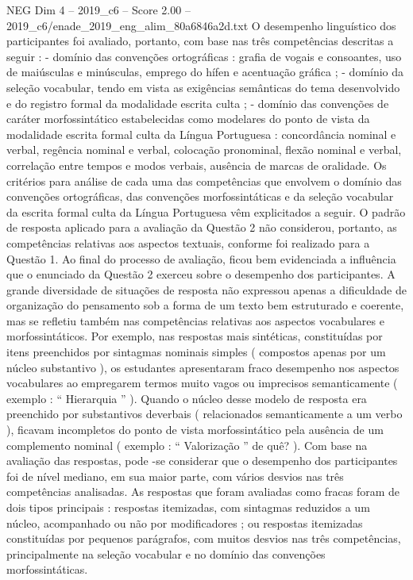 \begin{textsample}{NEG Dim 4 – 2019\_c6 – Score 2.00 – 2019\_c6/enade\_2019\_eng\_alim\_80a6846a2d.txt}
O desempenho linguístico dos participantes foi avaliado, portanto, com base nas três competências descritas a seguir : - domínio das convenções ortográficas : grafia de vogais e consoantes, uso de maiúsculas e minúsculas, emprego do hífen e acentuação gráfica ; - domínio da seleção vocabular, tendo em vista as exigências semânticas do tema desenvolvido e do registro formal da modalidade escrita culta ; - domínio das convenções de caráter morfossintático estabelecidas como modelares do ponto de vista da modalidade escrita formal culta da Língua Portuguesa : concordância nominal e verbal, regência nominal e verbal, colocação pronominal, flexão nominal e verbal, correlação entre tempos e modos verbais, ausência de marcas de oralidade.
Os critérios para análise de cada uma das competências que envolvem o domínio das convenções ortográficas, das convenções morfossintáticas e da seleção vocabular da escrita formal culta da Língua Portuguesa vêm explicitados a seguir.
O padrão de resposta aplicado para a avaliação da Questão 2 não considerou, portanto, as competências relativas aos aspectos textuais, conforme foi realizado para a Questão 1.
Ao final do processo de avaliação, ficou bem evidenciada a influência que o enunciado da Questão 2 exerceu sobre o desempenho dos participantes.
A grande diversidade de situações de resposta não expressou apenas a dificuldade de organização do pensamento sob a forma de um texto bem estruturado e coerente, mas se refletiu também nas competências relativas aos aspectos vocabulares e morfossintáticos.
Por exemplo, nas respostas mais sintéticas, constituídas por itens preenchidos por sintagmas nominais simples ( compostos apenas por um núcleo substantivo ), os estudantes apresentaram fraco desempenho nos aspectos vocabulares ao empregarem termos muito vagos ou imprecisos semanticamente ( exemplo : “ Hierarquia ” ).
Quando o núcleo desse modelo de resposta era preenchido por substantivos deverbais ( relacionados semanticamente a um verbo ), ficavam incompletos do ponto de vista morfossintático pela ausência de um complemento nominal ( exemplo : “ Valorização ” de quê? ).
Com base na avaliação das respostas, pode -se considerar que o desempenho dos participantes foi de nível mediano, em sua maior parte, com vários desvios nas três competências analisadas.
As respostas que foram avaliadas como fracas foram de dois tipos principais : respostas itemizadas, com sintagmas reduzidos a um núcleo, acompanhado ou não por modificadores ; ou respostas itemizadas constituídas por pequenos parágrafos, com muitos desvios nas três competências, principalmente na seleção vocabular e no domínio das convenções morfossintáticas.

\end{textsample}

